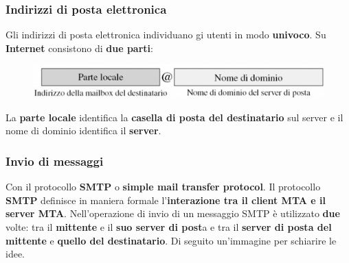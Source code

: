 \documentclass[11pt,a4paper,oneside]{book}
\theoremstyle{definition}
\begin{document}
\subsubsection{Indirizzi di posta elettronica}
Gli indirizzi di posta elettronica individuano gi utenti in modo \textbf{univoco}. Su \textbf{Internet} consistono di \textbf{due parti}:
\begin{figure}[!h]
	\includegraphics[scale=0.5]{Immagini/Mail_address.png}
	\centering
\end{figure}\newline
La \textbf{parte locale} identifica la \textbf{casella di posta del destinatario} sul server e il nome di dominio identifica il \textbf{server}.
\subsubsection{Invio di messaggi}
Con il protocollo \textbf{SMTP} o \textbf{simple mail transfer protocol}. Il protocollo \textbf{SMTP} definisce in maniera formale l'\textbf{interazione tra il client MTA e il server MTA}. Nell'operazione di invio di un messaggio SMTP è utilizzato \textbf{due} volte: tra il \textbf{mittente} e il \textbf{suo server di post}a e tra il \textbf{server di posta del mittente} e \textbf{quello del destinatario}. Di seguito un'immagine per schiarire le idee.

\pagebreak
\end{document}
